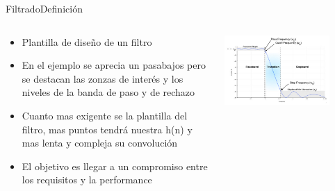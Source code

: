 \begin{frame}[t]{Filtrado}{Definición}
   \begin{columns}[t]
      \footnotesize
      \begin{column}{.4\textwidth}
         \begin{itemize}
            \item{Plantilla de diseño de un filtro}
            \item{En el ejemplo se aprecia un pasabajos pero se destacan las zonzas de interés y los niveles de la banda de paso y de rechazo}
            \item{Cuanto mas exigente se la plantilla del filtro, mas puntos tendrá nuestra h(n) y mas lenta y compleja su convolución}
            \item{El objetivo es llegar a un compromiso entre los requisitos y la performance }
         \end{itemize}
      \end{column}
      \hspace{2pt}
      \vrule
      \hspace{2pt}
      \begin{column}{.6\textwidth}
         \center\includegraphics[width=0.8\textwidth]{5_clase/pyfda3}
      \end{column}
      \hspace{2pt}
   \end{columns}
   \vfill
\end{frame}
